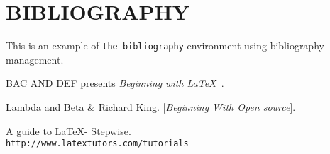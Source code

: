 \documentclass{article}
\begin{document}
\section*{BIBLIOGRAPHY}
This is an example of \texttt{the bibliography} environment using bibliography management.
 
\begin{thebibliography}{9}
BAC AND DEF presents   
\textit{Beginning with \LaTeX\ }.
 
Lambda and Beta \& Richard King.
[\textit{Beginning With Open source}]. 
 
A guide to \LaTeX - Stepwise.
\\\texttt{http://www.latextutors.com/tutorials}

\end{thebibliography}
\end{document}
